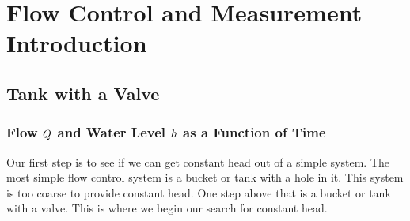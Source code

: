 \documentclass[letterpaper,10pt,english]{sphinxmanual}
\begin{document}
\chapter{Flow Control and Measurement Introduction}
\label{\detokenize{Flow_Control_and_Measurement/FCM_Intro:flow-control-and-measurement-introduction}}\label{\detokenize{Flow_Control_and_Measurement/FCM_Intro:title-flow-control-intro}}\label{\detokenize{Flow_Control_and_Measurement/FCM_Intro::doc}}

\section{Tank with a Valve}
\label{\detokenize{Flow_Control_and_Measurement/FCM_Intro:tank-with-a-valve}}\label{\detokenize{Flow_Control_and_Measurement/FCM_Intro:heading-tank-with-a-valve}}

\subsection{Flow \protect\(Q\protect\) and Water Level \protect\(h\protect\) as a Function of Time}
\label{\detokenize{Flow_Control_and_Measurement/FCM_Intro:flow-and-water-level-as-a-function-of-time}}\label{\detokenize{Flow_Control_and_Measurement/FCM_Intro:heading-qh-as-a-function-of-t}}
Our first step is to see if we can get constant head out of a simple system. The most simple flow control system is a bucket or tank with a hole in it. This system is too coarse to provide constant head. One step above that is a bucket or tank with a valve. This is where we begin our search for constant head.
\end{document}
